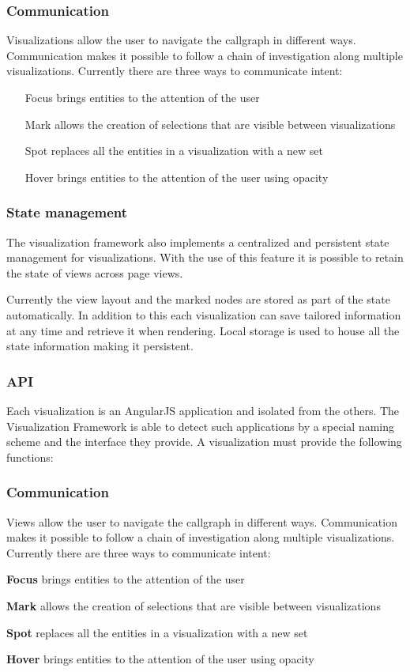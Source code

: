 \subsubsection{Communication}

Visualizations allow the user to navigate the callgraph in different ways. Communication makes it possible to follow a chain of investigation along multiple visualizations. Currently there are three ways to communicate intent:

\begin{itemize}
	\item[Focus] brings entities to the attention of the user
	\item[Mark] allows the creation of selections that are visible between visualizations
	\item[Spot] replaces all the entities in a visualization with a new set
	\item[Hover] brings entities to the attention of the user using opacity
\end{itemize}

\subsubsection{State management}

The visualization framework also implements a centralized and persistent state management for visualizations. With the use of this feature it is possible to retain the state of views across page views.

Currently the view layout and the marked nodes are stored as part of the state automatically. In addition to this each visualization can save tailored information at any time and retrieve it when rendering. Local storage is used to house all the state information making it persistent.

\subsubsection{API}
Each visualization is an AngularJS application and isolated from the others. The Visualization Framework is able to detect such applications by a special naming scheme and the interface they provide. A visualization must provide the following functions:

\subsubsection{Communication}

Views allow the user to navigate the callgraph in different ways. Communication makes it possible to follow a chain of investigation along multiple visualizations. Currently there are three ways to communicate intent:

\textbf{Focus} brings entities to the attention of the user

\textbf{Mark} allows the creation of selections that are visible between visualizations

\textbf{Spot} replaces all the entities in a visualization with a new set

\textbf{Hover} brings entities to the attention of the user using opacity